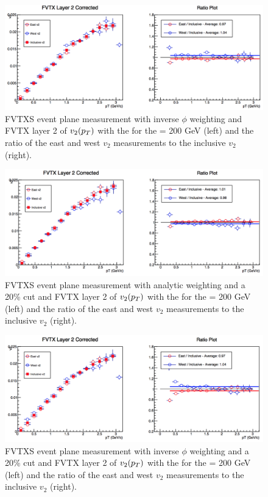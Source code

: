 \begin{figure}[!ht]
\centering
\includegraphics[width=0.65\linewidth]{figs/fvtx_2_data.png}
\caption{FVTXS event plane measurement with inverse $\phi$ weighting and FVTX layer 2 of $v_{2}(\mbox{$p_T$})$ with the  for the \pau \sqsn = 200 GeV (left) and the ratio of the east and west $v_2$ measurements to the inclusive $v_2$ (right).}
\end{figure}

\begin{figure}[!ht]
\centering
\includegraphics[width=0.65\linewidth]{figs/fvtx_2_analytic.png}
\caption{FVTXS event plane measurement with analytic weighting and a 20\% cut and FVTX layer 2 of $v_{2}(\mbox{$p_T$})$ with the  for the \pau \sqsn = 200 GeV (left) and the ratio of the east and west $v_2$ measurements to the inclusive $v_2$ (right).}
\end{figure}

\begin{figure}[!ht]
\centering
\includegraphics[width=0.65\linewidth]{figs/fvtx_2_data_cut.png}
\caption{FVTXS event plane measurement with inverse $\phi$ weighting and a 20\% cut and FVTX layer 2 of $v_{2}(\mbox{$p_T$})$ with the  for the \pau \sqsn = 200 GeV (left) and the ratio of the east and west $v_2$ measurements to the inclusive $v_2$ (right).}
\end{figure}

